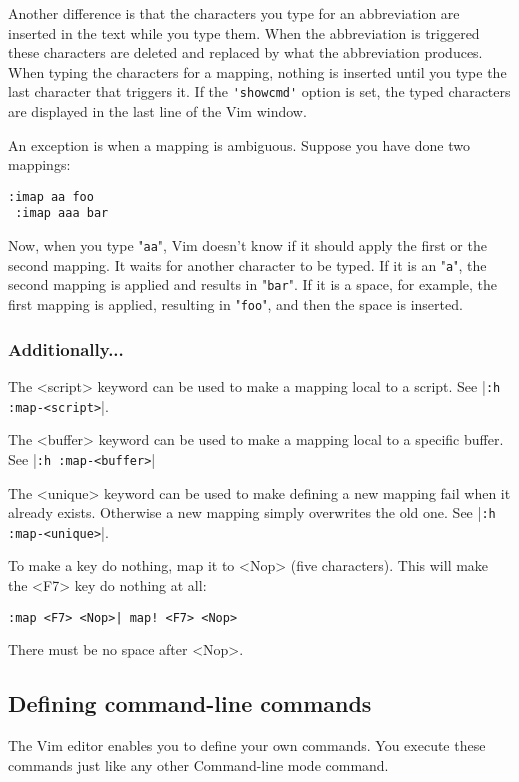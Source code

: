 {Another difference is that the characters you type for an abbreviation are inserted in the text while you type them.
When the abbreviation is triggered these characters are deleted and replaced by what the abbreviation produces.
When typing the characters for a mapping, nothing is inserted until you type the last character that triggers it.
If the \verb!'showcmd'! option is set, the typed characters are displayed in the last line of the Vim window.

An exception is when a mapping is ambiguous.
Suppose you have done two mappings:

\begin{Verbatim}[samepage=true]
 :imap aa foo
 :imap aaa bar
\end{Verbatim}

Now, when you type "\verb!aa!", Vim doesn't know if it should apply the first or the second mapping.
It waits for another character to be typed.
If it is an "\verb!a!", the second mapping is applied and results in "\verb!bar!".
If it is a space, for example, the first mapping is applied, resulting in "\verb!foo!", and then the space is inserted.

\subsubsection{Additionally...}
The <script> keyword can be used to make a mapping local to a script.
See |\verb!:h :map-<script>!|.

The <buffer> keyword can be used to make a mapping local to a specific buffer.
See |\verb!:h :map-<buffer>!|

The <unique> keyword can be used to make defining a new mapping fail when it already exists.
Otherwise a new mapping simply overwrites the old one.
See |\verb!:h :map-<unique>!|.

To make a key do nothing, map it to <Nop> (five characters).
This will make the <F7> key do nothing at all:

\begin{Verbatim}[samepage=true]
 :map <F7> <Nop>| map! <F7> <Nop>
\end{Verbatim}

There must be no space after <Nop>.
\subsection{Defining command-line commands}
The Vim editor enables you to define your own commands.
You execute these commands just like any other Command-line mode command.

}
